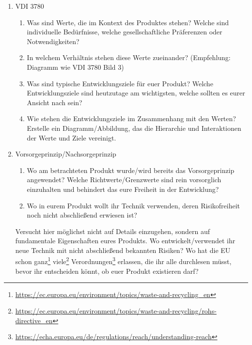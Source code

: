 \documentclass[headinclude=true]{scrartcl}
\begin{document}
\begin{enumerate}
	\item
	      VDI 3780

	      \begin{enumerate}
		      \item
		            Was sind Werte, die im Kontext des Produktes stehen? Welche sind
		            individuelle Bedürfnisse, welche gesellschaftliche Präferenzen oder
		            Notwendigkeiten?
		      \item
		            In welchem Verhältnis stehen diese Werte zueinander? (Empfehlung:
		            Diagramm wie VDI 3780 Bild 3)
		      \item
		            Was sind typische Entwicklungsziele für euer Produkt? Welche Entwicklungsziele sind heutzutage am wichtigsten, welche sollten es eurer Ansicht nach sein? \label{entwicklungsziele}
		            
		      \item
		            Wie stehen die Entwicklungsziele im Zusammenhang mit den Werten?
		            Erstelle ein Diagramm/Abbildung, das die Hierarchie und
		            Interaktionen der Werte und Ziele vereinigt.
	      \end{enumerate}
	\item
	      Vorsorgeprinzip/Nachsorgeprinzip

	      \begin{enumerate}
		      \item
		            Wo am betrachteten Produkt wurde/wird bereits das Vorsorgeprinzip
		            angewendet? Welche Richtwerte/Grenzwerte sind rein vorsorglich einzuhalten und behindert das eure Freiheit in der Entwicklung?
		      \item
		            Wo in eurem Produkt wollt ihr Technik verwenden, deren Risikofreiheit noch nicht abschließend erwiesen ist?
		    
	      \end{enumerate}
	      Versucht hier möglichst nicht auf Details einzugehen, sondern auf fundamentale Eigenschaften eures Produkts. Wo entwickelt/verwendet ihr neue Technik mit nicht abschließend bekannten Risiken? Wo hat die EU schon ganz\footnote{\url{https://ec.europa.eu/environment/topics/waste-and-recycling_en}} viele\footnote{\url{https://ec.europa.eu/environment/topics/waste-and-recycling/rohs-directive_en}} Verordnungen\footnote{\url{https://echa.europa.eu/de/regulations/reach/understanding-reach}} erlassen, die ihr alle durchlesen müsst, bevor ihr entscheiden könnt, ob euer Produkt existieren darf?
	      \end{enumerate}
\end{document}
